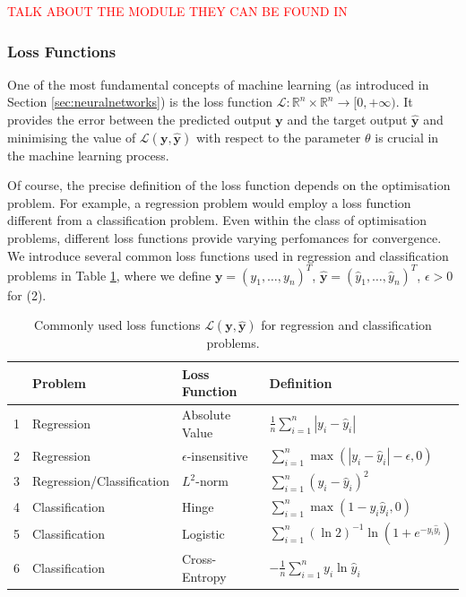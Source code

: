 \documentclass[a4paper,11pt,titlepage]{article}
\theoremstyle{definition}
\theoremstyle{plain}
\theoremstyle{remark}
\begin{document}
\textcolor{red}{TALK ABOUT THE MODULE THEY CAN BE FOUND IN}

\subsubsection{Loss Functions}

One of the most fundamental concepts of machine learning (as introduced in Section \ref{sec:neuralnetworks}) is the loss function $\mathcal{L}: \mathbb{R}^n \times \mathbb{R}^n \to [0, +\infty )$. It provides the error between the predicted output $\mathbf{y}$ and the target output $\mathbf{\hat{y}}$ and minimising the value of $\mathcal{L}(\mathbf{y}, \mathbf{\hat{y}})$ with respect to the parameter $\theta$ is crucial in the machine learning process. 

Of course, the precise definition of the loss function depends on the optimisation problem. For example, a regression problem would employ a loss function different from a classification problem. Even within the class of optimisation problems, different loss functions provide varying perfomances for convergence. We introduce several common loss functions used in regression and classification problems in Table \ref{tab:lfd}, where we define $\mathbf{y} = \left(y_1, \dots, y_n\right)^T$, $\mathbf{\hat{y}} = \left(\hat{y}_1, \dots, \hat{y}_n\right)^T$, $\epsilon > 0$ for (2).
\begin{table}[htbp]
    \centering
    \begin{tabular}{llll}
        \toprule
          & Problem  & Loss Function  &  Definition \\
        \midrule
        1 & Regression       & Absolute Value            & $\frac{1}{n}\sum_{i=1}^n |y_i - \hat{y}_i|$      \\
        2 &Regression       & $\epsilon$-insensitive   & $\sum_{i=1}^n \max{(|y_i - \hat{y}_i| - \epsilon, 0)}$\\
        3 & Regression/Classification       & $L^2$-norm                   & $\sum_{i=1}^n\left(y_i - \hat{y}_i\right)^2$        \\
        4 & Classification  & Hinge                     & $\sum_{i=1}^n\max{(1-y_i\hat{y}_i, 0)}$ \\
        5 & Classification  & Logistic                  & $\sum_{i=1}^n \left(\ln 2\right)^{-1}\ln(1 + e^{-y_i\hat{y}_i})$ \\
        6 & Classification  & Cross-Entropy             & $- \frac{1}{n} \sum_{i=1}^n y_i\ln \hat{y}_i$\\ 
        \bottomrule
    \end{tabular}
    \caption{Commonly used loss functions $\mathcal{L}(\mathbf{y}, \mathbf{\hat{y}})$ for regression and classification problems.}
    \label{tab:lfd}
\end{table}
\end{document}
